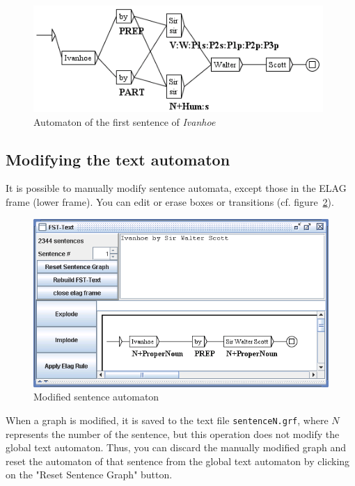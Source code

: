 \begin{figure}[!ht]
\begin{center}
\includegraphics[width=11cm]{resources/img/fig7-23.png}
\caption{Automaton of the first sentence of \textit{Ivanhoe}\label{fig-first-sentence-Ivanhoe}}
\end{center}
\end{figure}

\subsection{Modifying the text automaton}
It is possible to manually modify sentence automata, except those in the ELAG frame
(lower frame). You can edit or erase
boxes or transitions (cf. figure~\ref{fig-modified-sentence-automaton}).

\begin{figure}[!ht]
\begin{center}
\includegraphics[width=15cm]{resources/img/fig7-24.png}
\caption{Modified sentence automaton\label{fig-modified-sentence-automaton}}
\end{center}
\end{figure}

\bigskip
\noindent When a graph is modified, it is saved to the text file  
\verb+sentenceN.grf+, where $N$ represents the number of the sentence,
but this operation does not modify the global text automaton. Thus, you can discard the
manually modified graph and reset the automaton of that sentence from the global text automaton
by clicking on the "Reset Sentence Graph" button.

